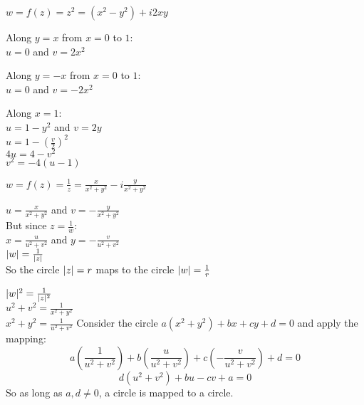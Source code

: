 \documentclass[letterpaper,12pt,fleqn]{article}
\begin{document}
\begin{example}
  $w=f(z)=z^2=(x^2-y^2)+i2xy$

  \begin{minipage}{3.5in}
  \end{minipage}
  \begin{minipage}{3in}
  \end{minipage}

  Along $y=x$ from $x=0$ to $1$: \\
  $u=0$ and $v=2x^2$
  
  Along $y=-x$ from $x=0$ to $1$: \\
  $u=0$ and $v=-2x^2$

  Along $x=1$: \\
  $u=1-y^2$ and $v=2y$ \\
  $u=1-(\frac{v}{2})^2$ \\
  $4u=4-v^2$ \\
  $v^2=-4(u-1)$
\end{example}

\begin{example}
  $w=f(z)=\frac{1}{z}=\frac{x}{x^2+y^2}-i\frac{y}{x^2+y^2}$
  
  $u=\frac{x}{x^2+y^2}$ and $v=-\frac{y}{x^2+y^2}$ \\
  But since $z=\frac{1}{w}$: \\
  $x=\frac{u}{u^2+v^2}$ and $y=-\frac{v}{u^2+v^2}$ \\

  $\lvert w\rvert=\frac{1}{\lvert z\rvert}$ \\
  So the circle $\lvert z\rvert=r$ maps to the circle $\lvert w\rvert=\frac{1}{r}$

  $\lvert w\rvert^2=\frac{1}{\lvert z\rvert^2}$ \\
  $u^2+v^2=\frac{1}{x^2+y^2}$ \\
  $x^2+y^2=\frac{1}{u^2+v^2}$
\newpage
  Consider the circle $a(x^2+y^2)+bx+cy+d=0$ and apply the mapping:
  \[a(\frac{1}{u^2+v^2})+b(\frac{u}{u^2+v^2})+c(-\frac{v}{u^2+v^2})+d=0\]
  \[d(u^2+v^2)+bu-cv+a=0\]
  So as long as $a,d\ne0$, a circle is mapped to a circle.
\end{example}
\end{document}
